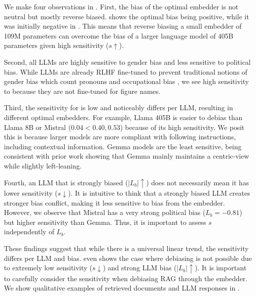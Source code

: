 




We make four observations in . First, the bias of the optimal embedder is not neutral but mostly reverse biased.  shows the optimal bias being positive, while it was initially negative in . This means that reverse biasing a small embedder of 109M parameters can overcome the bias of a larger language model of 405B parameters given high sensitivity ($s\uparrow$). 

Second, all LLMs are highly sensitive to gender bias and less sensitive to political bias. While LLMs are already RLHF fine-tuned to prevent traditional notions of gender bias which count pronouns and occupational bias \citep{lu2020gender,zmigrod2019counterfactual}, we see high sensitivity to \genderData because they are not fine-tuned for figure names. 

Third, the sensitivity for \politicalData is low and noticeably differs per LLM, resulting in different optimal embedders. For example, Llama 405B is easier to debias than Llama 8B or Mistral ($0.04 < 0.40,0.53$) because of its high sensitivity. We posit this is because larger models are more compliant with following instructions, including contextual information. Gemma models are the least sensitive, being consistent with prior work showing that Gemma \citep{trhlik2024quantifyinggenerativemediabias} mainly maintains a centric-view while slightly left-leaning.

Fourth, an LLM that is strongly biased ($|L_b|\uparrow$) does not necessarily mean it has lower sensitivity ($s\downarrow$). It is intuitive to think that a strongly biased LLM creates stronger bias conflict, making it less sensitive to bias from the embedder. However, we observe that Mistral has a very strong political bias ($L_b=-0.81$) but higher sensitivity than Gemma. Thus, it is important to assess $s$ independently of $L_b$.

These findings suggest that while there is a universal linear trend, the sensitivity differs per LLM and bias.  even shows the case where debiasing is not possible due to extremely low sensitivity ($s\downarrow$) and strong LLM bias ($|L_b|\uparrow$). It is important to carefully consider the sensitivity when debiasing RAG through the embedder. We show qualitative examples of retrieved documents and LLM responses in .

